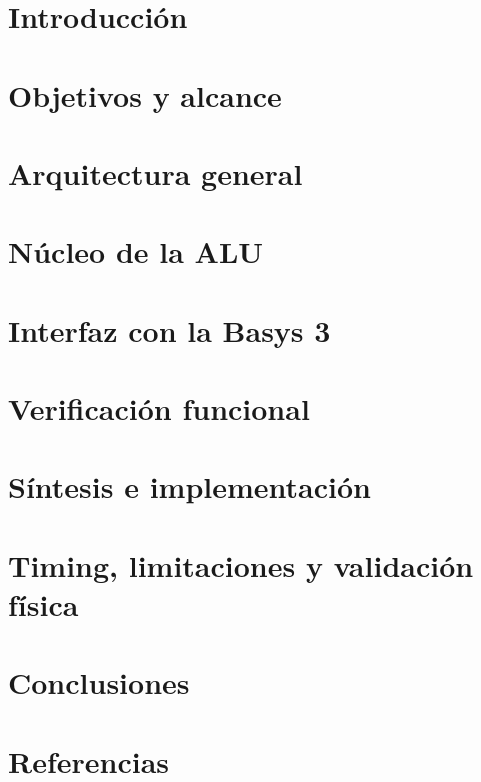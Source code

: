 \documentclass[12pt,a4paper,openany]{book}
\begin{document}
	
	\begingroup
	\pagestyle{plain}
	\tableofcontents
	\thispagestyle{plain}
	\endgroup
	\newpage

	\chapter{Introducción}
	

	\chapter{Objetivos y alcance}
	

	\chapter{Arquitectura general}
	

	\chapter{Núcleo de la ALU}
	

	\chapter{Interfaz con la Basys 3}
	

	\chapter{Verificación funcional}
	

	\chapter{Síntesis e implementación}
	

	\chapter{Timing, limitaciones y validación física}
	

	\chapter{Conclusiones}
	

	\chapter*{Referencias}
	
\end{document}
